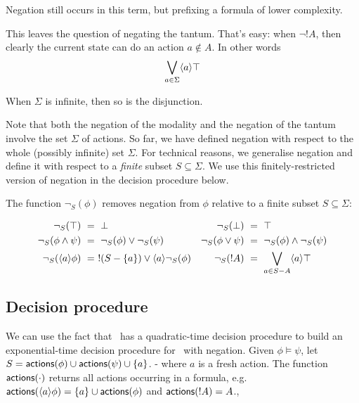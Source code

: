 \NI Negation still occurs in this term, but prefixing a formula of
lower complexity.

This leaves the question of negating the tantum. That's easy: when
$\neg !A$, then clearly the current state can do an action $a \notin
A$. In other words
\[
   \bigvee_{a \in \Sigma}\langle a \rangle \top
\]

\NI When $\Sigma$ is infinite, then so is the disjunction.

Note that both the negation of the modality and the negation of
the tantum involve the set $\Sigma$ of actions. 
So far, we have defined negation with respect to
the whole (possibly infinite) set $\Sigma$. For technical reasons, we
generalise negation and define it with respect to a \emph{finite}
subset $S \subseteq \Sigma$. We use this finitely-restricted version of
negation in the decision procedure below.

\begin{definition}
The function $\neg_{S}(\phi)$ removes negation from $\phi$
relative to a finite subset $S \subseteq \Sigma$:

\begin{align*}
  \neg_{S}(\top) &\ =\  \bot  &
  \neg_S(\bot) &\ =\  \top  \\
  \neg_S(\phi \land \psi) &\ =\  \neg_S(\phi) \lor \neg_S(\psi)  &
  \neg_S(\phi \lor \psi) &\ =\  \neg_S(\phi) \land \neg_S(\psi)  \\
  \neg_S(\langle a \rangle \phi) &\ =\  !(S-\{a\}) \lor \langle a \rangle \neg_S(\phi)  &
  \neg_S(! A) &\ =\  \bigvee_{a \in S - A} \langle a \rangle \top
\end{align*}


\end{definition}

\subsection{Decision procedure}

\NI We can use the fact that \cathoristic\ has a quadratic-time
decision procedure to build an exponential-time decision procedure for
\cathoristic\ with negation.  Given $\phi \models \psi$, let $S =
\mathsf{actions}(\phi) \cup \mathsf{actions}(\psi) \cup \{a\}$.  - where $a$ is a
fresh action.  The function $\mathsf{actions}(\cdot)$ returns all actions
occurring in a formula, e.g. $\mathsf{actions}(\langle a \rangle \phi) = \{a\} \cup
\mathsf{actions}(\phi)$ and $\mathsf{actions}(!A) = A$.,

